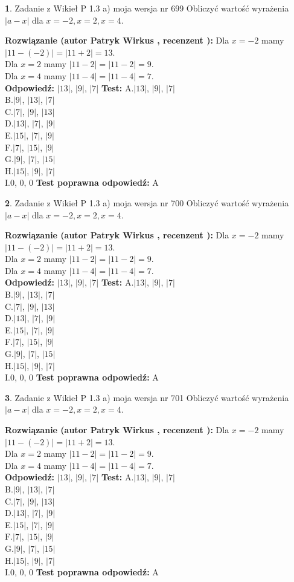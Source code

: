 \documentclass[12pt, a4paper]{article}
\theoremstyle{definition} %
\newtheorem{zad}{}
\newcommand{\zadStart}[1]{\begin{zad}#1\newline}
\newcommand{\zadStop}{\end{zad}}
\newcommand{\rozwStart}[2]{\noindent \textbf{Rozwiązanie (autor #1 , recenzent #2): }\newline}
\newcommand{\rozwStop}{\newline}
\newcommand{\odpStart}{\noindent \textbf{Odpowiedź:}\newline}
\newcommand{\odpStop}{\newline}
\newcommand{\testStart}{\noindent \textbf{Test:}\newline}
\newcommand{\testStop}{\newline}
\newcommand{\kluczStart}{\noindent \textbf{Test poprawna odpowiedź:}\newline}
\newcommand{\kluczStop}{\newline}
\begin{document}
\zadStart{Zadanie z Wikieł P 1.3 a) moja wersja nr 699}
Obliczyć wartość wyrażenia $|a - x|$ dla $x=-2,x=2,x=4$.
\zadStop
\rozwStart{Patryk Wirkus}{}
Dla $x = -2$ mamy $|11 - (-2)| = |11 + 2| = 13$.\\
Dla $x = 2$ mamy $|11 - 2| = |11 - 2| = 9$.\\
Dla $x = 4$ mamy $|11 - 4| = |11 - 4| = 7$.\\
\rozwStop
\odpStart
$|13|$, $|9|$, $|7|$
\odpStop
\testStart
A.$|13|$, $|9|$, $|7|$\\
B.$|9|$, $|13|$, $|7|$\\
C.$|7|$, $|9|$, $|13|$\\
D.$|13|$, $|7|$, $|9|$\\
E.$|15|$, $|7|$, $|9|$\\
F.$|7|$, $|15|$, $|9|$\\
G.$|9|$, $|7|$, $|15|$\\
H.$|15|$, $|9|$, $|7|$\\
I.$0$, $0$, $0$
\testStop
\kluczStart
A
\kluczStop



\zadStart{Zadanie z Wikieł P 1.3 a) moja wersja nr 700}
Obliczyć wartość wyrażenia $|a - x|$ dla $x=-2,x=2,x=4$.
\zadStop
\rozwStart{Patryk Wirkus}{}
Dla $x = -2$ mamy $|11 - (-2)| = |11 + 2| = 13$.\\
Dla $x = 2$ mamy $|11 - 2| = |11 - 2| = 9$.\\
Dla $x = 4$ mamy $|11 - 4| = |11 - 4| = 7$.\\
\rozwStop
\odpStart
$|13|$, $|9|$, $|7|$
\odpStop
\testStart
A.$|13|$, $|9|$, $|7|$\\
B.$|9|$, $|13|$, $|7|$\\
C.$|7|$, $|9|$, $|13|$\\
D.$|13|$, $|7|$, $|9|$\\
E.$|15|$, $|7|$, $|9|$\\
F.$|7|$, $|15|$, $|9|$\\
G.$|9|$, $|7|$, $|15|$\\
H.$|15|$, $|9|$, $|7|$\\
I.$0$, $0$, $0$
\testStop
\kluczStart
A
\kluczStop



\zadStart{Zadanie z Wikieł P 1.3 a) moja wersja nr 701}
Obliczyć wartość wyrażenia $|a - x|$ dla $x=-2,x=2,x=4$.
\zadStop
\rozwStart{Patryk Wirkus}{}
Dla $x = -2$ mamy $|11 - (-2)| = |11 + 2| = 13$.\\
Dla $x = 2$ mamy $|11 - 2| = |11 - 2| = 9$.\\
Dla $x = 4$ mamy $|11 - 4| = |11 - 4| = 7$.\\
\rozwStop
\odpStart
$|13|$, $|9|$, $|7|$
\odpStop
\testStart
A.$|13|$, $|9|$, $|7|$\\
B.$|9|$, $|13|$, $|7|$\\
C.$|7|$, $|9|$, $|13|$\\
D.$|13|$, $|7|$, $|9|$\\
E.$|15|$, $|7|$, $|9|$\\
F.$|7|$, $|15|$, $|9|$\\
G.$|9|$, $|7|$, $|15|$\\
H.$|15|$, $|9|$, $|7|$\\
I.$0$, $0$, $0$
\testStop
\kluczStart
A
\kluczStop
\end{document}
